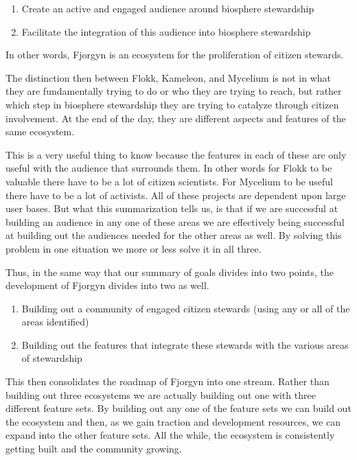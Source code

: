 \documentclass[10pt,a5paper]{book}
\begin{document}
\begin{enumerate}
\item Create an active and engaged audience around biosphere stewardship
\item Facilitate the integration of this audience into biosphere stewardship
\end{enumerate}

In other words, Fjorgyn is an ecosystem for the proliferation of citizen stewards.

The distinction then between Flokk, Kameleon, and Mycelium is not in what they are fundamentally trying to do or who they are trying to reach, but rather which step in biosphere stewardship they are trying to catalyze through citizen involvement. At the end of the day, they are different aspects and features of the same ecosystem. 

This is a very useful thing to know because the features in each of these are only useful with the audience that surrounds them. In other words for Flokk to be valuable there have to be a lot of citizen scientists. For Mycelium to be useful there have to be a lot of activists. All of these projects are dependent upon large user bases. But what this summarization tells us, is that if we are successful at building an audience in any one of these areas we are effectively being successful at building out the audiences needed for the other areas as well. By solving this problem in one situation we more or less solve it in all three. 

Thus, in the same way that our summary of goals divides into two points, the development of Fjorgyn divides into two as well.
\begin{enumerate}
\item Building out a community of engaged citizen stewards (using any or all of the areas identified)
\item Building out the features that integrate these stewards with the various areas of stewardship
\end{enumerate}

This then consolidates the roadmap of Fjorgyn into one stream. Rather than building out three ecosystems we are actually building out one with three different feature sets. By building out any one of the feature sets we can build out the ecosystem and then, as we gain traction and development resources, we can expand into the other feature sets. All the while, the ecosystem is consistently getting built and the community growing. 
\end{document}
